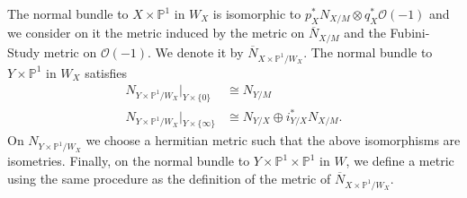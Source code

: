 \documentclass[10pt,twoside]{article}
\numberwithin{equation}{section}
\theoremstyle{plain}
\theoremstyle{definition}
\begin{document}
The normal bundle to $X\times \mathbb{P}^{1}$ in $W_{X}$ is isomorphic
to $p_{X}^{\ast}N_{X/M}\otimes q_{X}^{\ast}\mathcal{O}(-1)$ and we
consider on it the metric induced by the metric on $\overline N_{X/M}$
and the Fubini-Study metric on $\mathcal{O}(-1)$. We denote it by 
$\overline N_{X\times \mathbb{P}^{1}/W_{X}}$. The normal bundle to
$Y\times \mathbb{P}^{1}$ in $W_{X }$ satisfies
\begin{align*}
  N_{Y\times \mathbb{P}^{1}/W_{X}}|_{Y\times \{0\}}&\cong N_{Y/M}\\
  N_{Y\times \mathbb{P}^{1}/W_{X}}|_{Y\times \{\infty \}} &
  \cong N_{Y/X}\oplus i^{\ast}_{Y/X}N_{X/M}.
\end{align*}
On $N_{Y\times \mathbb{P}^{1}/W_{X}}$ we choose a hermitian metric
such that the above isomorphisms are isometries. Finally, on the normal
bundle to $Y\times \mathbb{P}^{1}\times \mathbb{P}^{1}$ in $W$, we
define a metric using the same procedure as the definition of the
metric of $\overline N_{X\times \mathbb{P}^{1}/W_{X}}$. 
\end{document}
